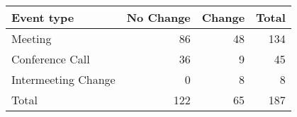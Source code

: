 \begin{tabular}{lrrr}
\toprule
          Event type &  No Change &  Change &  Total \\
\midrule
             Meeting &         86 &      48 &     134 \\
     Conference Call &         36 &       9 &      45 \\
 Intermeeting Change &          0 &       8 &       8 \\
               \hline  Total &        122 &      65 &     187 \\
\bottomrule
\end{tabular}
